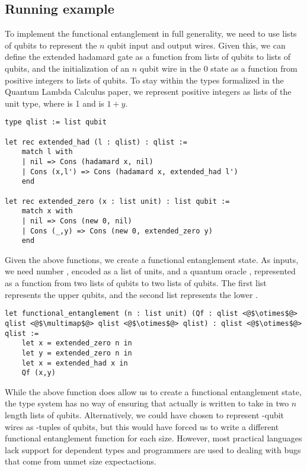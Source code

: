 \subsection{Running example}
To implement the functional entanglement in full generality, we need to use lists of qubits to represent the $n$ qubit input and output wires.
Given this, we can define the extended hadamard gate as a function from lists of qubits to lists of qubits, and the initialization of an $n$ qubit wire in the 0 state as a function from positive integers to lists of qubits.
To stay within the types formalized in the Quantum Lambda Calculus paper, we represent positive integers as lists of the unit type, where  is 1 and  is $1 + y$.
\begin{lstlisting}[style=customcoq]
type qlist := list qubit

let rec extended_had (l : qlist) : qlist :=
    match l with
    | nil => Cons (hadamard x, nil)
    | Cons (x,l') => Cons (hadamard x, extended_had l')
    end

let rec extended_zero (x : list unit) : list qubit :=
    match x with
    | nil => Cons (new 0, nil)
    | Cons (_,y) => Cons (new 0, extended_zero y)
    end
\end{lstlisting}

Given the above functions, we create a functional entanglement state.
As inputs, we need number , encoded as a list of units, and a quantum oracle , represented as a function from two lists of qubits to two lists of qubits.
The first list represents the upper  qubits, and the second list represents the lower .
\begin{lstlisting}[style=customcoq]
let functional_entanglement (n : list unit) (Qf : qlist <@$\otimes$@> qlist <@$\multimap$@> qlist <@$\otimes$@> qlist) : qlist <@$\otimes$@> qlist :=
    let x = extended_zero n in
    let y = extended_zero n in 
    let x = extended_had x in
    Qf (x,y)
\end{lstlisting}
While the above function does allow us to create a functional entanglement state, the type system has no way of ensuring that  actually is written to take in two $n$ length lists of qubits.
Alternatively, we could have chosen to represent -qubit wires as -tuples of qubits, but this would have forced us to write a different functional entanglement function for each size.
However, most practical languages lack support for dependent types and programmers are used to dealing with bugs that come from unmet size expectactions.


